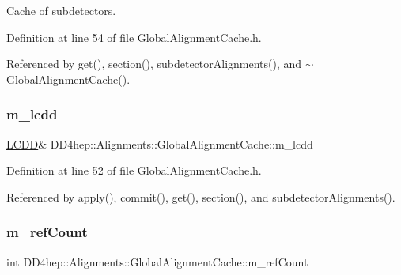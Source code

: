Cache of subdetectors. 



Definition at line 54 of file Global\+Alignment\+Cache.\+h.



Referenced by get(), section(), subdetector\+Alignments(), and $\sim$\+Global\+Alignment\+Cache().

\hypertarget{class_d_d4hep_1_1_alignments_1_1_global_alignment_cache_af1d0806e8ffced7c5d0f1438f58a6133}{}\label{class_d_d4hep_1_1_alignments_1_1_global_alignment_cache_af1d0806e8ffced7c5d0f1438f58a6133} 
\subsubsection{\texorpdfstring{m\+\_\+lcdd}{m\_lcdd}}
{\footnotesize\ttfamily \hyperlink{class_d_d4hep_1_1_geometry_1_1_l_c_d_d}{L\+C\+DD}\& D\+D4hep\+::\+Alignments\+::\+Global\+Alignment\+Cache\+::m\+\_\+lcdd\hspace{0.3cm}{\ttfamily [protected]}}



Definition at line 52 of file Global\+Alignment\+Cache.\+h.



Referenced by apply(), commit(), get(), section(), and subdetector\+Alignments().

\hypertarget{class_d_d4hep_1_1_alignments_1_1_global_alignment_cache_ac6889cb128e532b71a56ce2a2fdd305f}{}\label{class_d_d4hep_1_1_alignments_1_1_global_alignment_cache_ac6889cb128e532b71a56ce2a2fdd305f} 
\subsubsection{\texorpdfstring{m\+\_\+ref\+Count}{m\_refCount}}
{\footnotesize\ttfamily int D\+D4hep\+::\+Alignments\+::\+Global\+Alignment\+Cache\+::m\+\_\+ref\+Count\hspace{0.3cm}{\ttfamily [protected]}}



